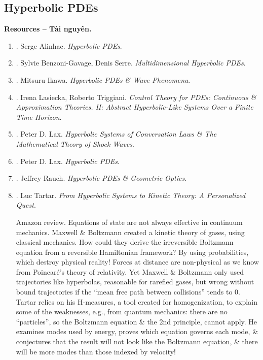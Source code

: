 \documentclass{article}
\begin{document}
\subsection{Hyperbolic PDEs}
\textbf{\textsf{Resources -- Tài nguyên.}}
\begin{enumerate}
	\item \cite{Alinhac2009}. {\sc Serge Alinhac}. {\it Hyperbolic PDEs}.
	\item \cite{Benzoni-Gavage_Serre2007}. {\sc Sylvie Benzoni-Gavage, Denis Serre}. {\it Multidimensional Hyperbolic PDEs}.
	\item \cite{Ikawa2000}. {\sc Mitsuru Ikawa}. {\it Hyperbolic PDEs \& Wave Phenomena}.
	\item \cite{Lasiecka_Triggiani2000}. {\sc Irena Lasiecka, Roberto Triggiani}. {\it Control Theory for PDEs: Continuous \& Approximation Theories. II: Abstract Hyperbolic-Like Systems Over a Finite Time Horizon}.
	\item \cite{Lax1987}. {\sc Peter D. Lax}. {\it Hyperbolic Systems of Conversation Laws \& The Mathematical Theory of Shock Waves}.
	\item \cite{Lax2006} . {\sc Peter D. Lax}. {\it Hyperbolic PDEs}.
	\item \cite{Rauch2012}. {\sc Jeffrey Rauch}. {\it Hyperbolic PDEs \& Geometric Optics}.
	
	\item \cite{Tartar2008}. {\sc Luc Tartar}. {\it From Hyperbolic Systems to Kinetic Theory: A Personalized Quest}.
	
	{\sf Amazon review.} Equations of state are not always effective in continuum mechanics. {\sc Maxwell \& Boltzmann} created a kinetic theory of gases, using classical mechanics. How could they derive the irreversible Boltzmann equation from a reversible Hamiltonian framework? By using probabilities, which destroy physical reality! Forces at distance are non-physical as we know from {\sc Poincar\'e}'s theory of relativity. Yet {\sc Maxwell \& Boltzmann} only used trajectories like hyperbolas, reasonable for rarefied gases, but wrong without bound trajectories if the ``mean free path between collisions'' tends to 0. {\sc Tartar} relies on his H-measures, a tool created for homogenization, to explain some of the weaknesses, e.g., from quantum mechanics: there are no ``particles'', so the Boltzmann equation \& the 2nd principle, cannot apply. He examines modes used by energy, proves which equation governs each mode, \& conjectures that the result will not look like the Boltzmann equation, \& there will be more modes than those indexed by velocity!
	

\end{enumerate}
\end{document}
